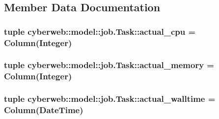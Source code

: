 \subsection{\-Member \-Data \-Documentation}
\hypertarget{classcyberweb_1_1model_1_1job_1_1_task_ae7ee2403de38a5b0bceec5d1f54d404b}{
\subsubsection[{actual\-\_\-cpu}]{\setlength{\rightskip}{0pt plus 5cm}tuple {\bf cyberweb\-::model\-::job.\-Task\-::actual\-\_\-cpu} = \-Column(\-Integer)}}\label{classcyberweb_1_1model_1_1job_1_1_task_ae7ee2403de38a5b0bceec5d1f54d404b}
\hypertarget{classcyberweb_1_1model_1_1job_1_1_task_a6076c422220095af259ec7e5a0fd0bf8}{
\subsubsection[{actual\-\_\-memory}]{\setlength{\rightskip}{0pt plus 5cm}tuple {\bf cyberweb\-::model\-::job.\-Task\-::actual\-\_\-memory} = \-Column(\-Integer)}}\label{classcyberweb_1_1model_1_1job_1_1_task_a6076c422220095af259ec7e5a0fd0bf8}
\hypertarget{classcyberweb_1_1model_1_1job_1_1_task_a7e0aae51b667bdd8a38fb898a089b0e8}{
\subsubsection[{actual\-\_\-walltime}]{\setlength{\rightskip}{0pt plus 5cm}tuple {\bf cyberweb\-::model\-::job.\-Task\-::actual\-\_\-walltime} = \-Column(\-Date\-Time)}}\label{classcyberweb_1_1model_1_1job_1_1_task_a7e0aae51b667bdd8a38fb898a089b0e8}
